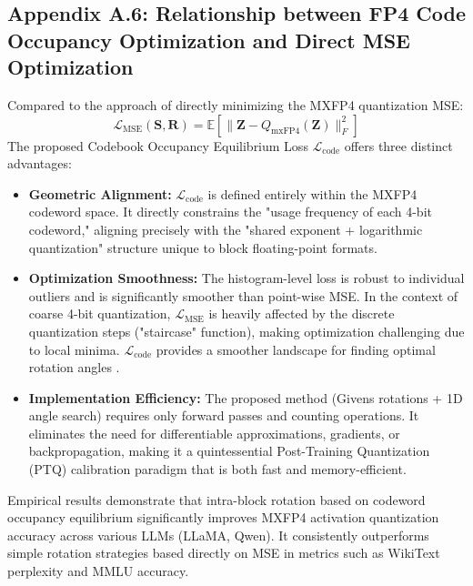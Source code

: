 \subsection*{Appendix A.6: Relationship between FP4 Code Occupancy Optimization and Direct MSE Optimization}
\label{app:loss_comparison}

Compared to the approach of directly minimizing the MXFP4 quantization MSE:
\begin{equation}
\mathcal{L}_{\text{MSE}}(\mathbf{S},\mathbf{R}) = \mathbb{E}\left[ \|\mathbf{Z} - Q_{\text{mxFP4}}(\mathbf{Z})\|_F^2 \right]
\end{equation}
The proposed Codebook Occupancy Equilibrium Loss $\mathcal{L}_{\text{code}}$ offers three distinct advantages:

\begin{itemize}
    \item \textbf{Geometric Alignment:} $\mathcal{L}_{\text{code}}$ is defined entirely within the MXFP4 codeword space. It directly constrains the "usage frequency of each 4-bit codeword," aligning precisely with the "shared exponent + logarithmic quantization" structure unique to block floating-point formats\cite{mxfp}.
    \item \textbf{Optimization Smoothness:} The histogram-level loss is robust to individual outliers and is significantly smoother than point-wise MSE. In the context of coarse 4-bit quantization, $\mathcal{L}_{\text{MSE}}$ is heavily affected by the discrete quantization steps ("staircase" function), making optimization challenging due to local minima. $\mathcal{L}_{\text{code}}$ provides a smoother landscape for finding optimal rotation angles \cite{qsurvey}.
    \item \textbf{Implementation Efficiency:} The proposed method (Givens rotations + 1D angle search) requires only forward passes and counting operations. It eliminates the need for differentiable approximations, gradients, or backpropagation, making it a quintessential Post-Training Quantization (PTQ) calibration paradigm that is both fast and memory-efficient.
\end{itemize}

Empirical results demonstrate that intra-block rotation based on codeword occupancy equilibrium significantly improves MXFP4 activation quantization accuracy across various LLMs (LLaMA, Qwen). It consistently outperforms simple rotation strategies based directly on MSE in metrics such as WikiText perplexity and MMLU accuracy.